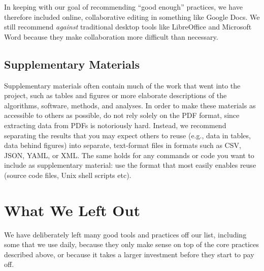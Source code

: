 \documentclass[10pt,letterpaper]{article}
\newcommand{\practicesection}[2]{\section{#1}\label{#2}}
\begin{document}
In keeping with our goal of recommending ``good enough'' practices, we
have therefore included online, collaborative editing in something like Google
Docs. We still recommend \emph{against} traditional desktop tools like
LibreOffice and Microsoft Word because they make collaboration more
difficult than necessary.

\subsection*{Supplementary Materials}

Supplementary materials often contain much of the work that went into
the project, such as tables and figures or more elaborate descriptions
of the algorithms, software, methods, and analyses. In order to make
these materials as accessible to others as possible, do not rely
solely on the PDF format, since extracting data from PDFs is
notoriously hard.  Instead, we recommend separating the results that
you may expect others to reuse (e.g., data in tables, data behind
figures) into separate, text-format files in formats such as
CSV, JSON, YAML, or XML. The same holds for any
commands or code you want to include as supplementary material: use
the format that most easily enables reuse (source code files, Unix
shell scripts etc).

\practicesection{What We Left Out}{sec:omitted}

We have deliberately left many good tools and practices off our list,
including some that we use daily, because they only make sense on top
of the core practices described above, or because it takes a larger
investment before they start to pay off.
\end{document}

